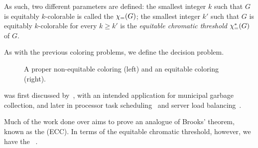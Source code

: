 As such, two different parameters are defined: the smallest integer $k$ such that $G$ is equitably $k$-colorable is called the  $\chi_{\mathcal{=}}(G)$; the smallest integer $k'$ such that $G$ is equitably $k$-colorable for every $k \geq k'$ is the \textit{equitable chromatic threshold} $\chi_{\mathcal{=}}^*(G)$ of $G$.

As with the previous coloring problems, we define the  decision problem.



\begin{figure}[!htb]
    \centering
    \hfill
    \hfill
    
    \caption{A proper non-equitable coloring (left) and an equitable coloring (right).}
    \label{fig:eq_color}
\end{figure}


 was first discussed by~\citep{first_equitable}, with an intended application for municipal garbage collection, and later in processor task scheduling~\citep{mutual_exclusion_scheduling} and server load balancing~\citep{domain_decomposition}.

Much of the work done over  aims to prove an analogue of Brooks' theorem, known as the  (ECC).
In terms of the equitable chromatic threshold, however, we have the ~\citep{hajnal_szmeredi_theorem}.

